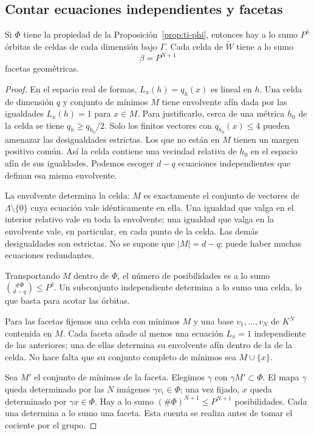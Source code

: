 \subsection{Contar ecuaciones independientes y facetas}

\begin{proposicion}
\label{prop:ti-celdas}
Si $\Phi$ tiene la propiedad de la
Proposición~\ref{prop:ti-phi}, entonces hay a lo sumo $P^\delta$
órbitas de celdas de cada dimensión bajo $\Gamma$.
Cada celda de $\widetilde W$ tiene a lo sumo
\begin{equation}
 \beta=P^{N+1}
 \label{eq:ti-facetas}
\end{equation}
facetas geométricas.
\end{proposicion}

\begin{proof}
En el espacio real de formas, $L_x(h)=q_h(x)$ es lineal
en $h$. Una celda de dimensión $q$ y conjunto de mínimos $M$
tiene envolvente afín dada por las igualdades $L_x(h)=1$
para $x\in M$. Para justificarlo, cerca de una métrica
$h_0$ de la celda se tiene $q_h\ge q_{h_0}/2$.
Solo los finitos vectores con $q_{h_0}(x)\le4$ pueden
amenazar las desigualdades estrictas. Los que no están
en $M$ tienen un margen positivo común. Así la celda
contiene una vecindad relativa de $h_0$ en el espacio
afín de sus igualdades. Podemos escoger $d-q$ ecuaciones
independientes que definan esa misma envolvente.

La envolvente determina la celda: $M$ es exactamente el
conjunto de vectores de $\Lambda\setminus\{0\}$ cuya ecuación
vale idénticamente en ella. Una igualdad que valga en el
interior relativo vale en toda la envolvente; una igualdad
que valga en la envolvente vale, en particular, en cada
punto de la celda. Las demás desigualdades son estrictas.
No se supone que $|M|=d-q$; puede haber muchas ecuaciones
redundantes.

Transportando $M$ dentro de $\Phi$, el número de posibilidades
es a lo sumo $\binom{\#\Phi}{d-q}\le P^\delta$.
Un subconjunto independiente determina a lo sumo una celda,
lo que basta para acotar las órbitas.

Para las facetas fijemos una celda con mínimos $M$ y una
base $v_1,\ldots,v_N$ de $K^N$ contenida en $M$.
Cada faceta añade al menos una ecuación $L_x=1$ independiente
de las anteriores; una de ellas determina su envolvente
afín dentro de la de la celda. No hace falta que su conjunto
completo de mínimos sea $M\cup\{x\}$.

Sea $M'$ el conjunto de mínimos de la faceta.
Elegimos $\gamma$ con $\gamma M'\subset\Phi$.
El mapa $\gamma$ queda determinado por las $N$ imágenes
$\gamma v_i\in\Phi$; una vez fijado, $x$ queda determinado
por $\gamma x\in\Phi$. Hay a lo sumo
$(\#\Phi)^{N+1}\le P^{N+1}$ posibilidades.
Cada una determina a lo sumo una faceta. Esta cuenta se
realiza antes de tomar el cociente por el grupo.
\end{proof}

